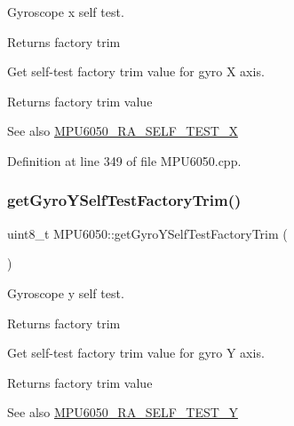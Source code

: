 Gyroscope x self test.

\begin{DoxyReturn}{Returns}
factory trim
\end{DoxyReturn}
Get self-\/test factory trim value for gyro X axis. \begin{DoxyReturn}{Returns}
factory trim value 
\end{DoxyReturn}
\begin{DoxySeeAlso}{See also}
\mbox{\hyperlink{MPU6050_8h_a7ec394e32416951b6882ebe6ae924965}{M\+P\+U6050\+\_\+\+R\+A\+\_\+\+S\+E\+L\+F\+\_\+\+T\+E\+S\+T\+\_\+X}} 
\end{DoxySeeAlso}


Definition at line 349 of file M\+P\+U6050.\+cpp.


\begin{DoxyCode}{0}

\end{DoxyCode}
\mbox{\label{classMPU6050_ae3e0610d6d3bb8162c4d5c99e0f53106}} 
\subsubsection{\texorpdfstring{getGyroYSelfTestFactoryTrim()}{getGyroYSelfTestFactoryTrim()}}
{\footnotesize\ttfamily uint8\+\_\+t M\+P\+U6050\+::get\+Gyro\+Y\+Self\+Test\+Factory\+Trim (\begin{DoxyParamCaption}{ }\end{DoxyParamCaption})}

Gyroscope y self test.

\begin{DoxyReturn}{Returns}
factory trim
\end{DoxyReturn}
Get self-\/test factory trim value for gyro Y axis. \begin{DoxyReturn}{Returns}
factory trim value 
\end{DoxyReturn}
\begin{DoxySeeAlso}{See also}
\mbox{\hyperlink{MPU6050_8h_afaeebb6ab18231c171fed704574987e7}{M\+P\+U6050\+\_\+\+R\+A\+\_\+\+S\+E\+L\+F\+\_\+\+T\+E\+S\+T\+\_\+Y}} 
\end{DoxySeeAlso}


